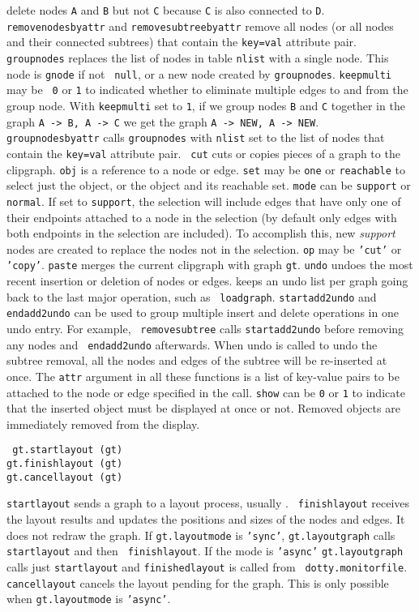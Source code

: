 delete nodes {\tt A} and {\tt B} but not {\tt C} because {\tt C} is also
connected to {\tt D}. {\tt removenodesbyattr} and {\tt removesubtreebyattr}
remove all nodes (or all nodes and their connected subtrees) that contain the
{\tt key=val} attribute pair. {\tt groupnodes} replaces the list of nodes in
table {\tt nlist} with a single node. This node is {\tt gnode} if not {\tt
null}, or a new node created by {\tt groupnodes}. {\tt keepmulti} may be {\tt
0} or {\tt 1} to indicated whether to eliminate multiple edges to and from the
group node. With {\tt keepmulti} set to {\tt 1}, if we group nodes {\tt B} and
{\tt C} together in the graph {\tt A -> B, A -> C} we get the graph {\tt A ->
NEW, A -> NEW}. {\tt groupnodesbyattr} calls {\tt groupnodes} with {\tt nlist}
set to the list of nodes that contain the {\tt key=val} attribute pair. {\tt
cut} cuts or copies pieces of a graph to the clipgraph. {\tt obj} is a
reference to a node or edge. {\tt set} may be {\tt one} or {\tt reachable} to
select just the object, or the object and its reachable set. {\tt mode} can be
{\tt support} or {\tt normal}. If set to {\tt support}, the selection will
include edges that have only one of their endpoints attached to a node in the
selection (by default only edges with both endpoints in the selection are
included). To accomplish this, new {\em support} nodes are created to replace
the nodes not in the selection. {\tt op} may be {\tt 'cut'} or {\tt 'copy'}.
{\tt paste} merges the current clipgraph with graph {\tt gt}. {\tt undo} undoes
the most recent insertion or deletion of nodes or edges. {\DOTTY} keeps an undo
list per graph going back to the last major operation, such as {\tt
loadgraph}. {\tt startadd2undo} and {\tt endadd2undo} can be used to group
multiple insert and delete operations in one undo entry. For example, {\tt
removesubtree} calls {\tt startadd2undo} before removing any nodes and {\tt
endadd2undo} afterwards. When undo is called to undo the subtree removal, all
the nodes and edges of the subtree will be re-inserted at once. The {\tt attr}
argument in all these functions is a list of key-value pairs to be attached to
the node or edge specified in the call. {\tt show} can be {\tt 0} or {\tt 1} to
indicate that the inserted object must be displayed at once or not. Removed
objects are immediately removed from the display.

\begin{flushleft}\tt
gt.startlayout (gt)\\
gt.finishlayout (gt)\\
gt.cancellayout (gt)\\
\end{flushleft}\vspace{-2\itemsep}
{\tt startlayout} sends a graph to a layout process, usually {\DOT}.  {\tt
finishlayout} receives the layout results and updates the positions and sizes
of the nodes and edges. It does not redraw the graph. If {\tt gt.layoutmode} is
{\tt 'sync'}, {\tt gt.layoutgraph} calls {\tt startlayout} and then {\tt
finishlayout}. If the mode is {\tt 'async'} {\tt gt.layoutgraph} calls just
{\tt startlayout} and {\tt finishedlayout} is called from {\tt
dotty.monitorfile}. {\tt cancellayout} cancels the layout pending for the
graph. This is only possible when {\tt gt.layoutmode} is {\tt 'async'}.

